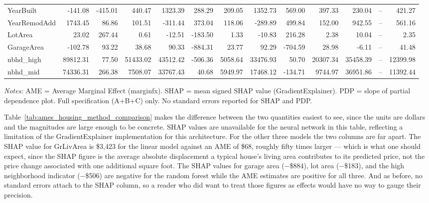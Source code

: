 \documentclass[12pt,a4paper]{article}
\numberwithin{equation}{section}
\theoremstyle{plain}
\theoremstyle{definition}
\begin{document}
\begin{table}
\begin{threeparttable}
\begin{tabular}{lrrrrrrrrrrrr}
				YearBuilt & -141.08 & -415.01 & 440.47 & 1323.39 & 288.29 & 209.05 & 1352.73 & 569.00 & 397.33 & 230.04 & -- & 421.27 \\
				YearRemodAdd & 1743.45 & 86.86 & 101.51 & -311.44 & 373.04 & 118.06 & -289.89 & 499.84 & 152.00 & 942.55 & -- & 561.16 \\
				\midrule
				LotArea & 23.02 & 267.44 & 0.61 & -12.51 & -183.50 & 1.33 & -10.83 & 216.28 & 2.38 & 10.04 & -- & 2.35 \\
				GarageArea & -102.78 & 93.22 & 38.68 & 90.33 & -884.31 & 23.77 & 92.29 & -704.59 & 28.98 & -6.11 & -- & 41.48 \\
				nbhd\_high & 89812.31 & 77.50 & 51433.02 & 43512.42 & -506.36 & 5058.64 & 33476.93 & 50.70 & 20307.34 & 35458.39 & -- & 12399.98 \\
				nbhd\_mid & 74336.31 & 266.38 & 7508.07 & 33767.43 & 40.68 & 5949.97 & 17468.12 & -134.71 & 9744.97 & 36951.86 & -- & 11392.44 \\
				\bottomrule
				\end{tabular}
				\begin{tablenotes}
				\footnotesize
				\item \textit{Notes:} AME = Average Marginal Effect (marginfx). SHAP = mean signed SHAP value (GradientExplainer). PDP = slope of partial dependence plot. Full specification (A+B+C) only. No standard errors reported for SHAP and PDP.
				\end{tablenotes}
		\end{threeparttable}
	\end{table}
	
	Table~\ref{tab:ames_housing_method_comparison} makes the difference between the two quantities easiest to see, since the units are dollars and the magnitudes are large enough to be concrete. SHAP values are unavailable for the neural network in this table, reflecting a limitation of the GradientExplainer implementation for this architecture. For the other three models the two columns are far apart. The SHAP value for GrLivArea is \$3,423 for the linear model against an AME of \$68, roughly fifty times larger --- which is what one should expect, since the SHAP figure is the average absolute displacement a typical house's living area contributes to its predicted price, not the price change associated with one additional square foot. The SHAP values for garage area ($-$\$884), lot area ($-$\$183), and the high neighborhood indicator ($-$\$506) are negative for the random forest while the AME estimates are positive for all three. And as before, no standard errors attach to the SHAP column, so a reader who did want to treat those figures as effects would have no way to gauge their precision.
\end{document}
